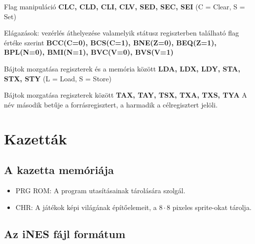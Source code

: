 \begin{compactdesc}
\begin{compactdesc}
	\end{compactdesc}
	\item Flag manipuláció \newline \textbf{CLC, CLD, CLI, CLV, SED, SEC, SEI}
	\newline
	(C = Clear, S = Set)
	\item Elágazások: vezérlés áthelyezése valamelyik státusz regiszterben található flag értéke szerint 
	\newline \textbf{BCC(C=0), BCS(C=1), BNE(Z=0), BEQ(Z=1), BPL(N=0), BMI(N=1),  BVC(V=0), BVS(V=1)}
	\item Bájtok mozgatása regiszterek és a memória között
	\newline
	\textbf{LDA, LDX, LDY, STA, STX, STY} 
	\newline
	(L = Load, S = Store)
	\item Bájtok mozgatása regiszterek között
	\newline
	\textbf{TAX, TAY, TSX, TXA, TXS, TYA}
	\newline
	A név második betűje a forrásregisztert, a harmadik a célregisztert jelöli.
\end{compactdesc}

\section{Kazetták}

\subsection{A kazetta memóriája}

\begin{itemize}
	\item PRG ROM: A program utasításainak tárolására szolgál. 
	\item CHR: A játékok képi világának építőelemeit, a $8 \cdot 8$ pixeles sprite-okat tárolja.
\end{itemize}

\subsection{Az iNES fájl formátum}



